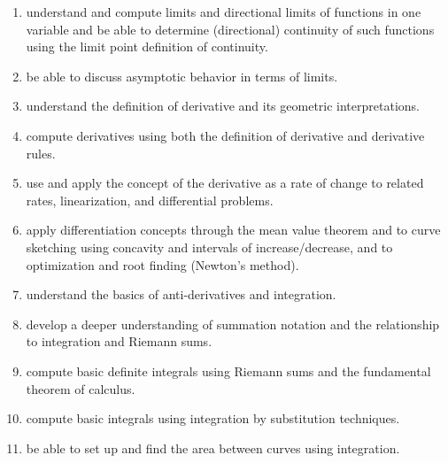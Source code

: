 \documentclass[11pt]{article}
\newenvironment{alphalist}{
\begin{enumerate}[label=(\arabic*),widest=107 ,leftmargin=25pt, itemsep=0pt]}
{\end{enumerate}}
\begin{document}
\begin{alphalist}
    \item  understand and compute limits and directional limits of functions in one variable and be able to determine (directional) continuity of such functions using the limit point definition of continuity.
    
    \item be able to discuss asymptotic behavior in terms of limits.

    \item understand the definition of derivative and its geometric interpretations.

    \item  compute derivatives using both the definition of derivative and derivative rules.

    \item use and apply the concept of the derivative as a rate of change to related rates, linearization, and differential problems.
    
    \item apply differentiation concepts through the mean value theorem and to curve sketching using concavity and intervals of increase/decrease, and to optimization and root finding (Newton's method).
    
    \item  understand the basics of anti-derivatives and integration.

    \item  develop a deeper understanding of summation notation and the relationship to integration and Riemann sums.
    
    \item compute basic definite integrals using Riemann sums and the fundamental theorem of calculus.

    \item compute basic integrals using integration by substitution techniques.

    \item  be able to set up and find the area between curves using integration.
    
    \end{alphalist}
\end{document}
